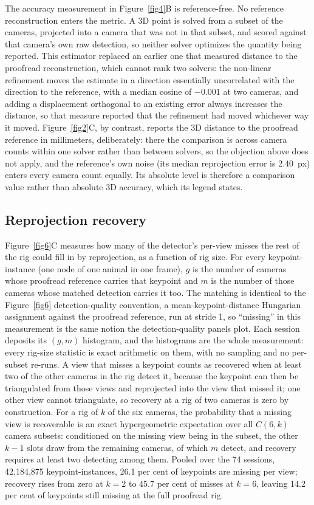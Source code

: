 \documentclass[pdflatex, sn-nature]{sn-jnl}
\theoremstyle{thmstyleone}%
\theoremstyle{thmstyletwo}%
\theoremstyle{thmstylethree}%
\begin{document}
The accuracy measurement in Figure~\ref{fig4}B is reference-free. No reference reconstruction enters the metric. A 3D point is solved from a subset of the cameras, projected into a camera that was not in that subset, and scored against that camera's own raw detection, so neither solver optimizes the quantity being reported. This estimator replaced an earlier one that measured distance to the proofread reconstruction, which cannot rank two solvers: the non-linear refinement moves the estimate in a direction essentially uncorrelated with the direction to the reference, with a median cosine of $-0.001$ at two cameras, and adding a displacement orthogonal to an existing error always increases the distance, so that measure reported that the refinement had moved whichever way it moved. Figure~\ref{fig2}C, by contrast, reports the 3D distance to the proofread reference in millimeters, deliberately: there the comparison is across camera counts within one solver rather than between solvers, so the objection above does not apply, and the reference's own noise (its median reprojection error is 2.40~px) enters every camera count equally. Its absolute level is therefore a comparison value rather than absolute 3D accuracy, which its legend states.

\subsection{Reprojection recovery}\label{methods-recovery}

Figure~\ref{fig6}C measures how many of the detector's per-view misses the rest of the rig could fill in by reprojection, as a function of rig size. For every keypoint-instance (one node of one animal in one frame), $g$ is the number of cameras whose proofread reference carries that keypoint and $m$ is the number of those cameras whose matched detection carries it too. The matching is identical to the Figure~\ref{fig6} detection-quality convention, a mean-keypoint-distance Hungarian assignment against the proofread reference, run at stride 1, so ``missing'' in this measurement is the same notion the detection-quality panels plot. Each session deposits its $(g, m)$ histogram, and the histograms are the whole measurement: every rig-size statistic is exact arithmetic on them, with no sampling and no per-subset re-runs. A view that misses a keypoint counts as recovered when at least two of the other cameras in the rig detect it, because the keypoint can then be triangulated from those views and reprojected into the view that missed it; one other view cannot triangulate, so recovery at a rig of two cameras is zero by construction. For a rig of $k$ of the six cameras, the probability that a missing view is recoverable is an exact hypergeometric expectation over all $C(6,k)$ camera subsets: conditioned on the missing view being in the subset, the other $k-1$ slots draw from the remaining cameras, of which $m$ detect, and recovery requires at least two detecting among them. Pooled over the 74 sessions, 42,184,875 keypoint-instances, 26.1 per cent of keypoints are missing per view; recovery rises from zero at $k = 2$ to 45.7 per cent of misses at $k = 6$, leaving 14.2 per cent of keypoints still missing at the full proofread rig.
\end{document}

